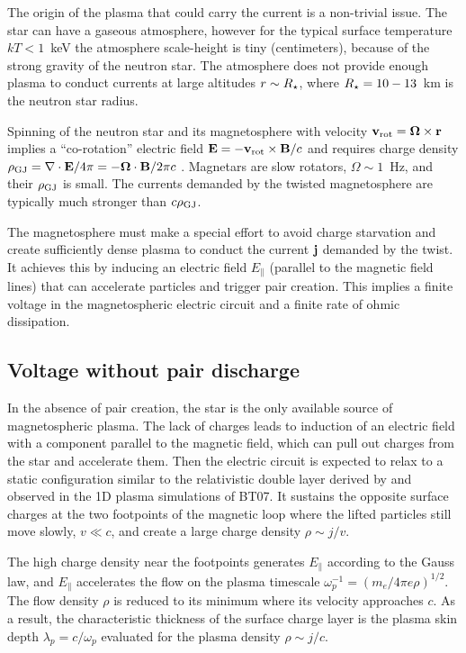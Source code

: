 The origin of the plasma that could carry the current is a non-trivial issue.
The star can have a gaseous atmosphere, however for the typical surface
temperature $kT<1$~keV the atmosphere scale-height is tiny (centimeters),
because of the strong gravity of the neutron star. The atmosphere does not provide
enough plasma to conduct currents at large altitudes $r\sim R_\star$, where
$R_\star=10-13$~km is the neutron star radius.

Spinning of the neutron star and its magnetosphere with velocity
${\mathbf v}_{\rm rot}=\bm{\Omega}\times{\mathbf r}$ implies a ``co-rotation'' electric field
${\mathbf E}=-{\mathbf v}_{\rm rot}\times{\mathbf B}/c$ and requires charge density
$\rho_\mathrm{GJ}=\nabla\cdot{\mathbf E}/4\pi=-\bm{\Omega}\cdot \mathbf{B}/2\pi c$
\citep{goldreich_pulsar_1969}.
Magnetars are slow rotators, $\Omega\sim 1$~Hz,
and their $\rho_{\rm GJ}$ is small. The currents demanded by the twisted magnetosphere
are typically much stronger than $c\rho_{\rm GJ}$.

The magnetosphere must make a
special effort to avoid charge starvation and create sufficiently dense plasma
to conduct the current ${\mathbf j}$ demanded by the twist.
It achieves this by inducing an electric field $E_\parallel$ (parallel to the
magnetic field lines) that can
accelerate particles
and trigger pair creation.
This implies a finite voltage in the magnetospheric electric circuit
and a finite rate of ohmic dissipation.


\subsection{Voltage without pair discharge}
\label{sec:v-no-pair}

In the absence of pair creation,
the star is the only available source of
magnetospheric
plasma. The lack of charges leads to induction of an electric field with
a component parallel to the magnetic field, which can pull out charges from
the star and accelerate them.
Then the
electric circuit is expected to relax to a static configuration
similar to the relativistic double layer derived by
\citet{carlqvist_physics_1982}
and observed in the 1D plasma simulations of BT07.
It sustains the opposite surface charges at the two footpoints of the magnetic loop
where the lifted particles still move slowly, $v\ll c$, and create a large charge density
$\rho\sim j/v$.

The high charge density near the footpoints generates $E_\parallel$ according to
the Gauss law, and $E_\parallel$ accelerates the flow on the plasma timescale
$\omega_p^{-1}=(m_e/4\pi e\rho)^{1/2}$. The flow density $\rho$ is reduced to
its minimum where its velocity approaches $c$. As a result, the characteristic
thickness of the surface charge layer is the plasma skin depth
$\lambda_p=c/\omega_p$ evaluated for the plasma density $\rho\sim j/c$.

